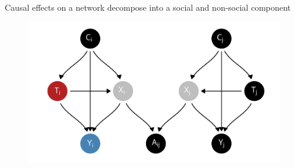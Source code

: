 \documentclass[aspectratio=169]{beamer}
\theoremstyle{remark}
\begin{document}
\begin{frame}{Causal effects on a network decompose into a social and non-social component}
    \begin{figure}
        \centering
        \includegraphics[width=\textwidth]{./figures/dags/homophily-mediating.png}
    \end{figure}
\end{frame}
\end{document}
